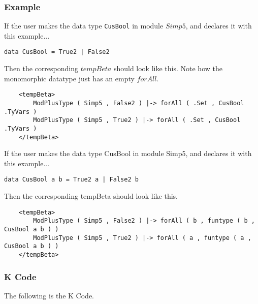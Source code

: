 \subsubsection{Example}
If the user makes the data type \texttt{CusBool} in module $Simp5$, and declares it with this example...
\begin{lstlisting}
data CusBool = True2 | False2
\end{lstlisting}

Then the corresponding $tempBeta$ should look like this. Note how the monomorphic datatype just has an empty $forAll$.

\begin{lstlisting}
    <tempBeta>
        ModPlusType ( Simp5 , False2 ) |-> forAll ( .Set , CusBool .TyVars )
        ModPlusType ( Simp5 , True2 ) |-> forAll ( .Set , CusBool .TyVars )
    </tempBeta>
\end{lstlisting}

If the user makes the data type CusBool in module Simp5, and declares it with this example...
\begin{lstlisting}
data CusBool a b = True2 a | False2 b
\end{lstlisting}

Then the corresponding tempBeta should look like this.
\begin{lstlisting}
    <tempBeta>
        ModPlusType ( Simp5 , False2 ) |-> forAll ( b , funtype ( b , CusBool a b ) )
        ModPlusType ( Simp5 , True2 ) |-> forAll ( a , funtype ( a , CusBool a b ) )
    </tempBeta>

\end{lstlisting}

\subsubsection{K Code}
The following is the K Code.

